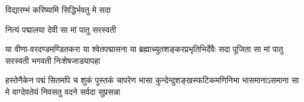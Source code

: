 
{विद्यारम्भं करिष्यामि सिद्धिर्भवतु मे सदा}

{नित्यं पद्मालया देवी सा मां पातु सरस्वती}

{या वीणा-वरदण्डमण्डितकरा या श्वेतपद्मासना}
{या ब्रह्माच्युतशङ्करप्रभृतिभिर्देवैः सदा पूजिता}
{सा मां पातु सरस्वती भगवती निःशेषजाड्यापहा}

{हस्तेनैकेन पद्मं सितमपि च शुकं पुस्तकं चापरेण}
{भासा कुन्देन्दुशङ्खस्फटिकमणिनिभा भासमानाऽसमाना}
{सा मे वाग्देवतेयं निवसतु वदने सर्वदा सुप्रसन्ना}

\closesub